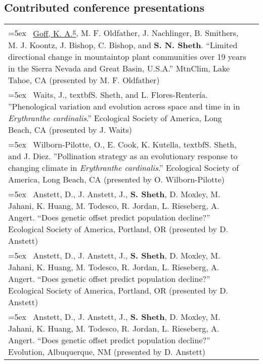 \documentclass[11pt,english]{article}\usepackage[]{graphicx}\usepackage[]{xcolor}
\providecommand{\tabularnewline}{\\}
\begin{document}
\subsection*{Contributed conference presentations} %
\enlargethispage{5\baselineskip} %
\vspace{-1ex}

\renewcommand{\arraystretch}{1.2}
\begin{tabularx}{\textwidth}{@{}>{\raggedright}p{5.25in} >{\raggedleft}X@{}}

\hangindent=5ex \ \underline{Goff, K. A.\textsuperscript{g}}, M. F. Oldfather, J. Nachlinger, B. Smithers, M. J. Koontz, J. Bishop, C. Bishop, and \textbf{S. N. Sheth}. ``Limited directional change in mountaintop plant communities over 19 years in the
Sierra Nevada and Great Basin, U.S.A.'' MtnClim, Lake Tahoe, CA (presented by M. F. Oldfather) & 2024 \tabularnewline

\hangindent=5ex \ Waits, J., textbf{S. Sheth}, and L. Flores-Renter\'{i}a. ''Phenological variation and evolution across space and time in in \emph{Erythranthe cardinalis}.'' Ecological Society of America, Long Beach, CA (presented by J. Waits) & 2024 \tabularnewline

\hangindent=5ex \ Wilborn-Pilotte, O., E. Cook, K. Kutella, textbf{S. Sheth}, and J. Diez. ''Pollination strategy as an evolutionary response to changing climate in \emph{Erythranthe cardinalis}.'' Ecological Society of America, Long Beach, CA (presented by O. Wilborn-Pilotte) & 2024 \tabularnewline

\hangindent=5ex \ Anstett, D., J. Anstett, J., \textbf{S. Sheth}, D. Moxley, M. Jahani, K. Huang, M. Todesco, R. Jordan, L. Rieseberg, A. Angert. ``Does genetic offset predict population decline?'' Ecological Society of America, Portland, OR (presented by D. Anstett) & 2023 \tabularnewline

\hangindent=5ex \ Anstett, D., J. Anstett, J., \textbf{S. Sheth}, D. Moxley, M. Jahani, K. Huang, M. Todesco, R. Jordan, L. Rieseberg, A. Angert. ``Does genetic offset predict population decline?'' Ecological Society of America, Portland, OR (presented by D. Anstett) & 2023 \tabularnewline

\hangindent=5ex \ Anstett, D., J. Anstett, J., \textbf{S. Sheth}, D. Moxley, M. Jahani, K. Huang, M. Todesco, R. Jordan, L. Rieseberg, A. Angert. ``Does genetic offset predict population decline?'' Evolution, Albuquerque, NM (presented by D. Anstett) & 2023 \tabularnewline


\end{tabularx}
\end{document}

